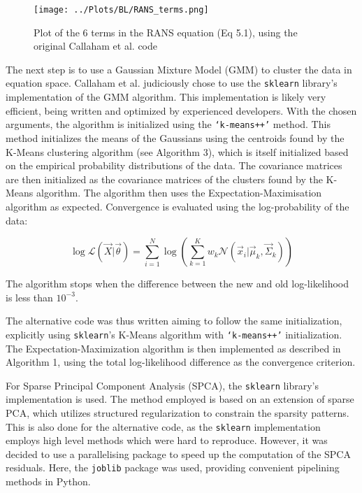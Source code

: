\documentclass[12pt]{report} %
\begin{document}
\begin{figure}
  \centering
  \texttt{[image: ../Plots/BL/RANS\_terms.png]}
  \caption{Plot of the 6 terms in the RANS equation (Eq 5.1), using the original Callaham et al. code}
  \label{fig:RANS_terms}
\end{figure}

The next step is to use a Gaussian Mixture Model (GMM) to cluster the data in equation space. Callaham et al. judiciously chose to use the \texttt{sklearn} library’s implementation of the GMM algorithm. This implementation is likely very efficient, being written and optimized by experienced developers. With the chosen arguments, the algorithm is initialized using the \texttt{‘k-means++’} method. This method initializes the means of the Gaussians using the centroids found by the K-Means clustering algorithm (see Algorithm 3), which is itself initialized based on the empirical probability distributions of the data\cite{arthur2007kmeans}. The covariance matrices are then initialized as the covariance matrices of the clusters found by the K-Means algorithm. The algorithm then uses the Expectation-Maximisation algorithm as expected. Convergence is evaluated using the log-probability of the data:

\begin{equation}
  \log \mathcal{L}(\vec{X} | \vec{\theta}) = \sum_{i=1}^{N} \log \left( \sum_{k=1}^{K} w_k \mathcal{N}(\vec{x}_i | \vec{\mu}_k, \vec{\Sigma}_k) \right)
\end{equation}

The algorithm stops when the difference between the new and old log-likelihood is less than $10^{-3}$.

The alternative code was thus written aiming to follow the same initialization, explicitly using \texttt{sklearn}’s K-Means algorithm with \texttt{‘k-means++’} initialization. The Expectation-Maximization algorithm is then implemented as described in Algorithm 1, using the total log-likelihood difference as the convergence criterion.

For Sparse Principal Component Analysis (SPCA), the \texttt{sklearn} library’s implementation is used. The method employed is based on an extension of sparse PCA, which utilizes structured regularization to constrain the sparsity patterns. This is also done for the alternative code, as the \texttt{sklearn} implementation employs high level methods which were hard to reproduce\cite{jenatton2010structured,mairal2010online}. However, it was decided to use a parallelising package to speed up the computation of the SPCA residuals. Here, the \texttt{joblib} package was used, providing convenient pipelining methods in Python\cite{joblib}.
\end{document}
